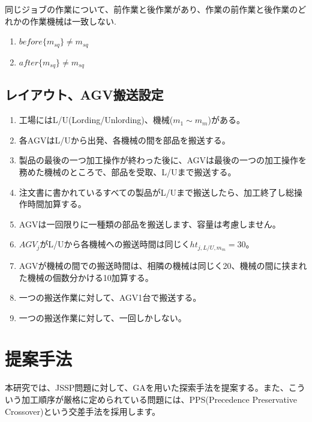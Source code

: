 \documentclass{jarticle}
\begin{document}
    同じジョブの作業について、前作業と後作業があり、作業の前作業と後作業のどれかの作業機械は一致しない.\\

\begin{enumerate}
    \item $before\{m_{sq}\} \neq m_{sq}$ \\
    \item $after\{m_{sq}\} \neq m_{sq}$ \\
    \end{enumerate}

\subsection{レイアウト、AGV搬送設定}
\begin{enumerate}
    \item 工場にはL/U(Lording/Unlording)、機械($m_{1} \sim m_{m}$)がある。
    \item 各AGVはL/Uから出発、各機械の間を部品を搬送する。
    \item 製品の最後の一つ加工操作が終わった後に、AGVは最後の一つの加工操作を務めた機械のところで、部品を受取、L/Uまで搬送する。
    \item 注文書に書かれているすべての製品がL/Uまで搬送したら、加工終了し総操作時間加算する。
    \item AGVは一回限りに一種類の部品を搬送します、容量は考慮しません。
    \item $AGV_j$がL/Uから各機械への搬送時間は同じく$ht_{j,L/U,m_{m}}=30$。
    \item AGVが機械の間での搬送時間は、相隣の機械は同じく20、機械の間に挟まれた機械の個数分かける10加算する。
    \item 一つの搬送作業に対して、AGV1台で搬送する。
    \item 一つの搬送作業に対して、一回しかしない。
    \end{enumerate}

\section{提案手法}
本研究では、JSSP問題に対して、GAを用いた探索手法を提案する。また、こういう加工順序が厳格に定められている問題には、PPS(Precedence Preservative Crossover)という交差手法を採用します。
\end{document}
